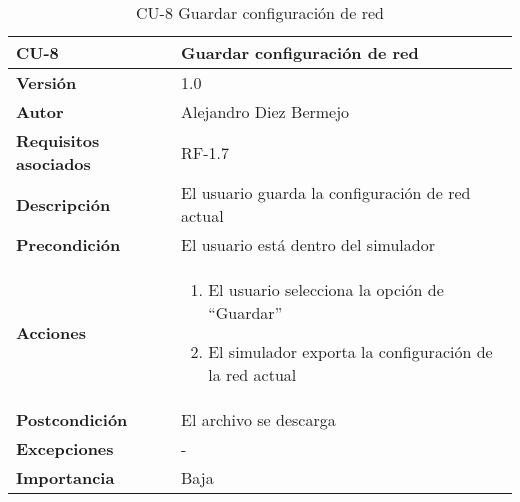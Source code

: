 \begin{table}[p]
	\centering
	\begin{tabularx}{\linewidth}{ p{} p{} }
		\toprule
		\textbf{CU-8}    & \textbf{Guardar configuración de red}\\
		\toprule
		\textbf{Versión}              & 1.0    \\
		\textbf{Autor}                & Alejandro Diez Bermejo \\
		\textbf{Requisitos asociados} & RF-1.7 \\
		\textbf{Descripción}          & El usuario guarda la configuración de red actual \\
        \textbf{Precondición}         & El usuario está dentro del simulador \\
		\textbf{Acciones}             &
		\begin{enumerate}
			\def\labelenumi{\arabic{enumi}.}
			\tightlist
			\item El usuario selecciona la opción de ``Guardar''
            \item El simulador exporta la configuración de la red actual
		\end{enumerate}\\
		\textbf{Postcondición}        & El archivo se descarga \\
		\textbf{Excepciones}          & - \\
		\textbf{Importancia}          & Baja \\
		\bottomrule
	\end{tabularx}
	\caption{CU-8 Guardar configuración de red}
\end{table}

